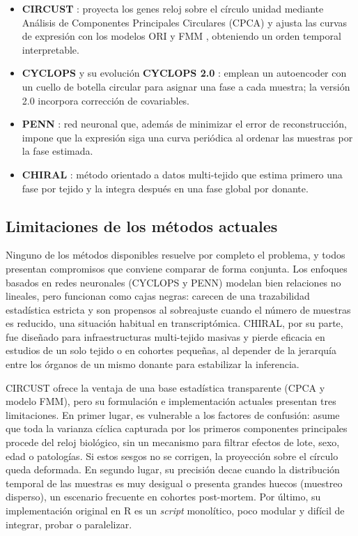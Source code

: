\documentclass[12pt, a4paper]{report}
\begin{document}
\begin{itemize}
    \item \textbf{CIRCUST} \cite{larriba2023}: proyecta los genes reloj sobre el círculo unidad mediante Análisis de Componentes Principales Circulares (CPCA) \cite{scholz2007} y ajusta las curvas de expresión con los modelos ORI \cite{larribaORI} y FMM \cite{fmmAlgorithm}, obteniendo un orden temporal interpretable.
    \item \textbf{CYCLOPS} \cite{CYCLOPS} y su evolución \textbf{CYCLOPS 2.0} \cite{CYCLOPS2}: emplean un autoencoder con un cuello de botella circular para asignar una fase a cada muestra; la versión 2.0 incorpora corrección de covariables.
    \item \textbf{PENN} \cite{penn2023}: red neuronal que, además de minimizar el error de reconstrucción, impone que la expresión siga una curva periódica al ordenar las muestras por la fase estimada.
    \item \textbf{CHIRAL} \cite{chiral2020}: método orientado a datos multi-tejido que estima primero una fase por tejido y la integra después en una fase global por donante.
\end{itemize}

\subsection{Limitaciones de los métodos actuales}
\label{subsec:limitaciones}

Ninguno de los métodos disponibles resuelve por completo el problema, y todos presentan compromisos que conviene comparar de forma conjunta. Los enfoques basados en redes neuronales (CYCLOPS y PENN) modelan bien relaciones no lineales, pero funcionan como cajas negras: carecen de una trazabilidad estadística estricta y son propensos al sobreajuste cuando el número de muestras es reducido, una situación habitual en transcriptómica. CHIRAL, por su parte, fue diseñado para infraestructuras multi-tejido masivas y pierde eficacia en estudios de un solo tejido o en cohortes pequeñas, al depender de la jerarquía entre los órganos de un mismo donante para estabilizar la inferencia.

CIRCUST ofrece la ventaja de una base estadística transparente (CPCA y modelo FMM), pero su formulación e implementación actuales presentan tres limitaciones. En primer lugar, es vulnerable a los factores de confusión: asume que toda la varianza cíclica capturada por los primeros componentes principales procede del reloj biológico, sin un mecanismo para filtrar efectos de lote, sexo, edad o patologías. Si estos sesgos no se corrigen, la proyección sobre el círculo queda deformada. En segundo lugar, su precisión decae cuando la distribución temporal de las muestras es muy desigual o presenta grandes huecos (muestreo disperso), un escenario frecuente en cohortes post-mortem. Por último, su implementación original en R es un \textit{script} monolítico, poco modular y difícil de integrar, probar o paralelizar.
\end{document}
